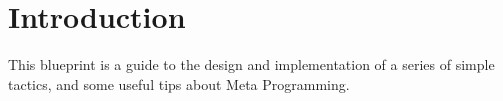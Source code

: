 \chapter{Introduction}
\label{section-introduction}

\noindent
This blueprint is a guide to the design and implementation of a series of simple tactics,
and some useful tips about Meta Programming.

